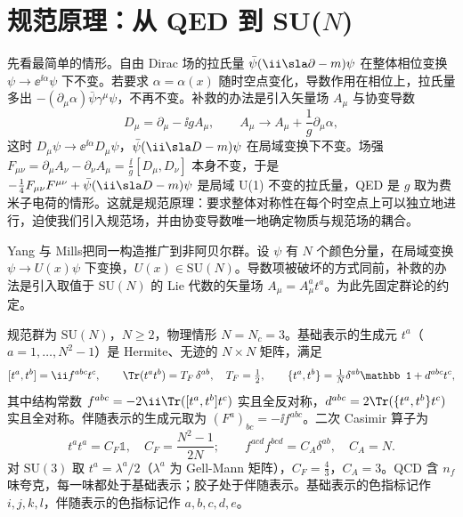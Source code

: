 \section{规范原理：从 QED 到 SU($N$)}\label{sec:qcd-gauge}

先看最简单的情形。自由 Dirac 场的拉氏量 $\bar\psi(\ii\sla\partial-m)\psi$ 在整体相位变换 $\psi\to\ee^{\ii\alpha}\psi$ 下不变。若要求 $\alpha=\alpha(x)$ 随时空点变化，导数作用在相位上，拉氏量多出 $-(\partial_\mu\alpha)\bar\psi\gamma^\mu\psi$，不再不变。补救的办法是引入矢量场 $A_\mu$ 与协变导数
\[
D_\mu=\partial_\mu-\ii gA_\mu,\qquad A_\mu\to A_\mu+\frac1g\partial_\mu\alpha ,
\]
这时 $D_\mu\psi\to\ee^{\ii\alpha}D_\mu\psi$，$\bar\psi(\ii\sla D-m)\psi$ 在局域变换下不变。场强 $F_{\mu\nu}=\partial_\mu A_\nu-\partial_\nu A_\mu=\frac{\ii}{g}[D_\mu,D_\nu]$ 本身不变，于是 $-\frac14F_{\mu\nu}F^{\mu\nu}+\bar\psi(\ii\sla D-m)\psi$ 是局域 U(1) 不变的拉氏量，QED 是 $g$ 取为费米子电荷的情形。这就是规范原理：要求整体对称性在每个时空点上可以独立地进行，迫使我们引入规范场，并由协变导数唯一地确定物质与规范场的耦合。

Yang 与 Mills\cite{Yang:1954ek}把同一构造推广到非阿贝尔群。设 $\psi$ 有 $N$ 个颜色分量，在局域变换 $\psi\to U(x)\psi$ 下变换，$U(x)\in\mathrm{SU}(N)$。导数项被破坏的方式同前，补救的办法是引入取值于 $\mathrm{SU}(N)$ 的 Lie 代数的矢量场 $A_\mu=A^a_\mu t^a$。为此先固定群论的约定。

\begin{definition}\label{def:qcd-gauge-group}
规范群为 $\mathrm{SU}(N)$，$N\ge2$，物理情形 $N=N_c=3$。基础表示的生成元 $t^a$（$a=1,\dots,N^2-1$）是 Hermite、无迹的 $N\times N$ 矩阵，满足 %
\begin{equation}\label{eq:qcd-generators}
[t^a,t^b]=\ii f^{abc}t^c,\qquad \Tr(t^at^b)=T_F\,\delta^{ab},\quad T_F=\tfrac12,\qquad \{t^a,t^b\}=\tfrac1N\delta^{ab}\mathbb 1+d^{abc}t^c,
\end{equation}
其中结构常数 $f^{abc}=-2\ii\Tr([t^a,t^b]t^c)$ 实且全反对称，$d^{abc}=2\Tr(\{t^a,t^b\}t^c)$ 实且全对称。伴随表示的生成元取为 $(F^a)_{bc}=-\ii f^{abc}$。二次 Casimir 算子为
\begin{equation}\label{eq:qcd-casimirs}
t^at^a=C_F\mathbb 1,\quad C_F=\frac{N^2-1}{2N};\qquad f^{acd}f^{bcd}=C_A\delta^{ab},\quad C_A=N .
\end{equation}
对 $\mathrm{SU}(3)$ 取 $t^a=\lambda^a/2$（$\lambda^a$ 为 Gell-Mann 矩阵），$C_F=\frac43$，$C_A=3$。QCD 含 $n_f$ 味夸克，每一味都处于基础表示；胶子处于伴随表示。基础表示的色指标记作 $i,j,k,l$，伴随表示的色指标记作 $a,b,c,d,e$。
\end{definition}

